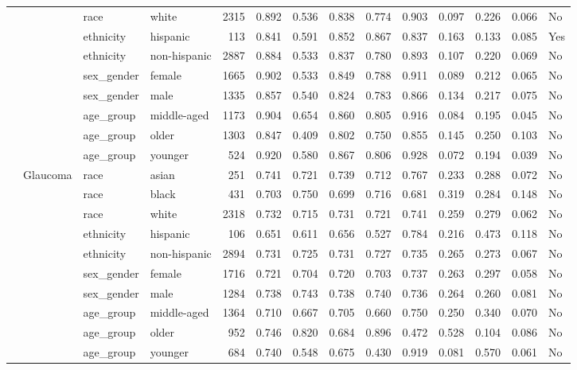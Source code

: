 \begin{longtable}{@{}lll l rrrrrrrr@{}}
 &  & race & white & 2315 & 0.892 & 0.536 & 0.838 & 0.774 & 0.903 & 0.097 & 0.226 & 0.066 & No \\
 &  & ethnicity & hispanic & 113 & 0.841 & 0.591 & 0.852 & 0.867 & 0.837 & 0.163 & 0.133 & 0.085 & Yes \\
 &  & ethnicity & non-hispanic & 2887 & 0.884 & 0.533 & 0.837 & 0.780 & 0.893 & 0.107 & 0.220 & 0.069 & No \\
 &  & sex\_gender & female & 1665 & 0.902 & 0.533 & 0.849 & 0.788 & 0.911 & 0.089 & 0.212 & 0.065 & No \\
 &  & sex\_gender & male & 1335 & 0.857 & 0.540 & 0.824 & 0.783 & 0.866 & 0.134 & 0.217 & 0.075 & No \\
 &  & age\_group & middle-aged & 1173 & 0.904 & 0.654 & 0.860 & 0.805 & 0.916 & 0.084 & 0.195 & 0.045 & No \\
 &  & age\_group & older & 1303 & 0.847 & 0.409 & 0.802 & 0.750 & 0.855 & 0.145 & 0.250 & 0.103 & No \\
 &  & age\_group & younger & 524 & 0.920 & 0.580 & 0.867 & 0.806 & 0.928 & 0.072 & 0.194 & 0.039 & No \\
 & Glaucoma & race & asian & 251 & 0.741 & 0.721 & 0.739 & 0.712 & 0.767 & 0.233 & 0.288 & 0.072 & No \\
 &  & race & black & 431 & 0.703 & 0.750 & 0.699 & 0.716 & 0.681 & 0.319 & 0.284 & 0.148 & No \\
 &  & race & white & 2318 & 0.732 & 0.715 & 0.731 & 0.721 & 0.741 & 0.259 & 0.279 & 0.062 & No \\
 &  & ethnicity & hispanic & 106 & 0.651 & 0.611 & 0.656 & 0.527 & 0.784 & 0.216 & 0.473 & 0.118 & No \\
 &  & ethnicity & non-hispanic & 2894 & 0.731 & 0.725 & 0.731 & 0.727 & 0.735 & 0.265 & 0.273 & 0.067 & No \\
 &  & sex\_gender & female & 1716 & 0.721 & 0.704 & 0.720 & 0.703 & 0.737 & 0.263 & 0.297 & 0.058 & No \\
 &  & sex\_gender & male & 1284 & 0.738 & 0.743 & 0.738 & 0.740 & 0.736 & 0.264 & 0.260 & 0.081 & No \\
 &  & age\_group & middle-aged & 1364 & 0.710 & 0.667 & 0.705 & 0.660 & 0.750 & 0.250 & 0.340 & 0.070 & No \\
 &  & age\_group & older & 952 & 0.746 & 0.820 & 0.684 & 0.896 & 0.472 & 0.528 & 0.104 & 0.086 & No \\
 &  & age\_group & younger & 684 & 0.740 & 0.548 & 0.675 & 0.430 & 0.919 & 0.081 & 0.570 & 0.061 & No \\

\end{longtable}
